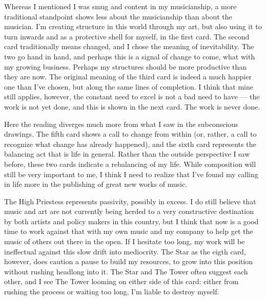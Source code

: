 Whereas I mentioned I was smug and content in my musicianship, a more
traditional standpoint shows less about the musicianship than about the
musician.  I'm creating structure in this world through my art, but also
using it to turn inwards and as a protective shell for myself, in the
first card.  The second card traditionally means changed, and I chose
the meaning of inevitability.   The two go hand in hand, and perhaps
this is a signal of change to come, what with my growing business.
Perhaps my structures should be more productive than they are now.  The
original meaning of the third card is indeed a much happier one than
I've chosen, but along the same lines of completion.  I think that mine
still applies, however, the constant need to excel is not a bad need to
have --- the work is not yet done, and this is shown in the next card.
The work is never done.

Here the reading diverges much more from what I saw in the subconscious
drawings.  The fifth card shows a call to change from within (or,
rather, a call to recognize what change has already happened), and the
sixth card represents the balancing act that is life in general.  Rather
than the outside perspective I saw before, these two cards indicate a
rebalancing of my life.  While composition will still be very important
to me, I think I need to realize that I've found my calling in life more
in the publishing of great new works of music.  

The High Priestess represents passivity, possibly in excess.  I do still
believe that music and art are not currently being herded to a very
constructive destination by both artists and policy makers in this
country, but I think that now is a good time to work against that with
my own music and my company to help get the music of others out there in
the open.  If I hesitate too long, my work will be ineffectual against
this slow drift into mediocrity.  The Star as the eigth card, however,
does caution a pause to build my resources, to grow into this position
without rushing headlong into it.  The Star and The Tower often suggest
each other, and I see The Tower looming on either side of this card:
either from rushing the process or waiting too long, I'm liable to
destroy myself.

